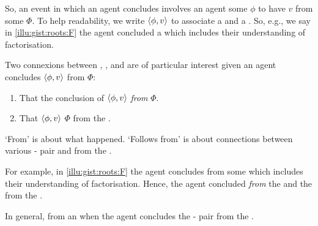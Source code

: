 \begin{note}
  So, an event in which an agent concludes involves an agent \evaling{} some  \(\phi\) to have  \(v\) from some \pool{} \(\Phi\).
  To help readability, we write \(\langle\phi, v\rangle\) to associate a  and a .
  So, e.g., we say in \autoref{illu:gist:roots:F} the agent concluded  a \pool{} which includes their understanding of factorisation.
\end{note}


\begin{note}
  Two connexions between , , and  are of particular interest given an  agent concludes \(\langle\phi, v\rangle\) from \(\Phi\):
  \begin{enumerate}
  \item
    That the \agents{} conclusion of \(\langle\phi, v\rangle\) \emph{from} \(\Phi\).
  \item
    That \(\langle\phi, v\rangle\) \emph{} \(\Phi\) from the \agpe{}.
  \end{enumerate}
  `From' is about what happened.
  `Follows from' is about connections between various - pair and \pool{} from the \agpe{}.

  For example, in \autoref{illu:gist:roots:F} the agent concludes  from some \pool{} which includes their understanding of factorisation.
  Hence, the agent concluded  \emph{from} the \pool{} and  \emph{\fof{}} the \pool{} from the \agpe{}.

  In general,  from an \agpe{} when the agent concludes the - pair from the \pool{}.
\end{note}


